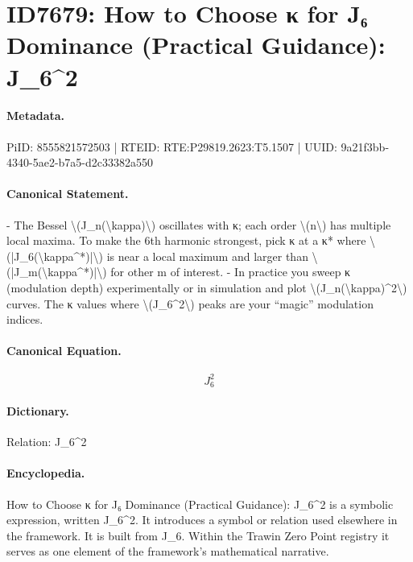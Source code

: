 \section*{ID7679: How to Choose κ for J₆ Dominance (Practical Guidance): J\_6\textasciicircum{}2}
\paragraph{Metadata.}
PiID: 8555821572503 | RTEID: RTE:P29819.2623:T5.1507 | UUID: 9a21f3bb-4340-5ae2-b7a5-d2c33382a550

\paragraph{Canonical Statement.}
- The Bessel \textbackslash{}(J\_n(\textbackslash{}kappa)\textbackslash{}) oscillates with κ; each order \textbackslash{}(n\textbackslash{}) has multiple local maxima. To make the 6th harmonic strongest, pick κ at a κ* where \textbackslash{}(|J\_6(\textbackslash{}kappa\textasciicircum{}*)|\textbackslash{}) is near a local maximum and larger than \textbackslash{}(|J\_m(\textbackslash{}kappa\textasciicircum{}*)|\textbackslash{}) for other m of interest. - In practice you sweep κ (modulation depth) experimentally or in simulation and plot \textbackslash{}(J\_n(\textbackslash{}kappa)\textasciicircum{}2\textbackslash{}) curves. The κ values where \textbackslash{}(J\_6\textasciicircum{}2\textbackslash{}) peaks are your “magic” modulation indices.

\paragraph{Canonical Equation.}
\[
J_6^2
\]

\paragraph{Dictionary.}
Relation: J\_6\textasciicircum{}2

\paragraph{Encyclopedia.}
How to Choose κ for J₆ Dominance (Practical Guidance): J\_6\textasciicircum{}2 is a symbolic expression, written J\_6\textasciicircum{}2. It introduces a symbol or relation used elsewhere in the framework. It is built from J\_6. Within the Trawin Zero Point registry it serves as one element of the framework's mathematical narrative.
